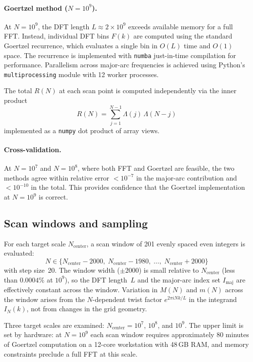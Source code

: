 \documentclass[11pt,a4paper]{article}
\newcommand{\RN}{R(N)}
\newcommand{\MN}{M(N)}
\newcommand{\mN}{m(N)}
\newcommand{\IN}{I_N(k)}
\begin{document}
\paragraph{Goertzel method ($N = 10^9$).}
At $N = 10^9$, the DFT length $L \approx 2 \times 10^9$ exceeds available memory for a full FFT. Instead, individual DFT bins $F(k)$ are computed using the standard Goertzel recurrence, which evaluates a single bin in $O(L)$ time and $O(1)$ space. The recurrence is implemented with \texttt{numba} just-in-time compilation for performance. Parallelism across major-arc frequencies is achieved using Python's \texttt{multiprocessing} module with 12 worker processes.

The total $\RN$ at each scan point is computed independently via the inner product
\begin{equation}
\RN = \sum_{j=1}^{N-1} \Lambda(j)\,\Lambda(N-j)
\end{equation}
implemented as a \texttt{numpy} dot product of array views.

\paragraph{Cross-validation.}
At $N = 10^7$ and $N = 10^8$, where both FFT and Goertzel are feasible, the two methods agree within relative error $< 10^{-7}$ in the major-arc contribution and $< 10^{-10}$ in the total. This provides confidence that the Goertzel implementation at $N = 10^9$ is correct.


\subsection{Scan windows and sampling}

For each target scale $N_{\mathrm{center}}$, a scan window of 201 evenly spaced even integers is evaluated:
\begin{equation}
N \in \{N_{\mathrm{center}} - 2000,\; N_{\mathrm{center}} - 1980,\; \ldots,\; N_{\mathrm{center}} + 2000\}
\end{equation}
with step size~20. The window width ($\pm 2000$) is small relative to $N_{\mathrm{center}}$ (less than $0.0004\%$ at $10^9$), so the DFT length~$L$ and the major-arc index set $I_{\mathrm{maj}}$ are effectively constant across the window. Variation in $\MN$ and $\mN$ across the window arises from the $N$-dependent twist factor $e^{2\pi i N k / L}$ in the integrand $\IN$, not from changes in the grid geometry.

Three target scales are examined: $N_{\mathrm{center}} = 10^7$, $10^8$, and $10^9$. The upper limit is set by hardware: at $N = 10^9$ each scan window requires approximately 80 minutes of Goertzel computation on a 12-core workstation with 48\,GB RAM, and memory constraints preclude a full FFT at this scale.
\end{document}
